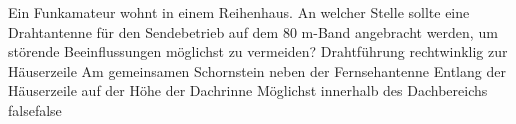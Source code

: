     {Ein Funkamateur wohnt in einem Reihenhaus. An welcher Stelle sollte eine Drahtantenne für den Sendebetrieb auf dem 80 m-Band angebracht werden, um störende Beeinflussungen möglichst zu vermeiden?}
    {Drahtführung rechtwinklig zur Häuserzeile}
    {Am gemeinsamen Schornstein neben der Fernsehantenne}
    {Entlang der Häuserzeile auf der Höhe der Dachrinne}
    {Möglichst innerhalb des Dachbereichs}
    {false}{false}